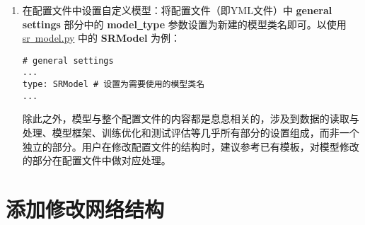 \documentclass[../main.tex]{subfiles}
\begin{document}
\begin{enumerate}
    \item 在配置文件中设置自定义模型：将配置文件（即YML文件）中 \textbf{general settings} 部分中的 \textbf{model\underline{~}type} 参数设置为新建的模型类名即可。以使用 \href{https://github.com/XPixelGroup/BasicSR/tree/master/basicsr/models/sr_model.py}{sr\underline{~}model.py} 中的 \textbf{SRModel} 为例：
          \begin{verbatim}
# general settings
...
type: SRModel # 设置为需要使用的模型类名
...
\end{verbatim}
          除此之外，模型与整个配置文件的内容都是息息相关的，涉及到数据的读取与处理、模型框架、训练优化和测试评估等几乎所有部分的设置组成，而非一个独立的部分。用户在修改配置文件的结构时，建议参考已有模板，对模型修改的部分在配置文件中做对应处理。

\end{enumerate}

\section{添加修改网络结构}\label{howto:add_arch}
\end{document}
